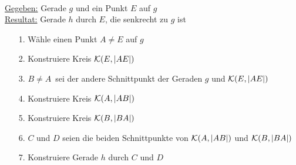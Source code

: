 \begin{konst}  
\phantom{Pups}\hspace*{1cm}\phantom{Pups}\\
\underline{Gegeben:} Gerade $g$ und ein Punkt $E$ auf $g$\\ 
\underline{Resultat:} Gerade $h$ durch $E$, die senkrecht zu $g$ ist 
\begin{enumerate}
\item[1.] Wähle einen Punkt $A\not=E$ auf $g$
\item[2.] Konstruiere Kreis ${\mathcal K}(E,|AE|)$
\item[3.] $B\not=A$~sei der andere Schnittpunkt der Geraden $g$ und ${\mathcal K}(E,|AE|)$
\item[4.] Konstruiere Kreis ${\mathcal K}(A,|AB|)$
\item[5.] Konstruiere Kreis ${\mathcal K}(B,|BA|)$
\item[6.] $C$ und $D$ seien die beiden Schnittpunkte von ${\mathcal K}(A,|AB|)$ und ${\mathcal K}(B,|BA|)$
\item[7.] Konstruiere Gerade $h$ durch $C$ und $D$
\end{enumerate}
\end{konst}







